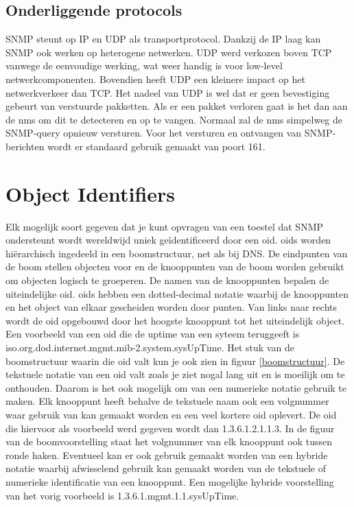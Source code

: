 \subsection{Onderliggende protocols}

SNMP steunt op IP en UDP als transportprotocol. Dankzij de IP laag kan SNMP ook werken op heterogene netwerken.
UDP werd verkozen boven TCP vanwege de eenvoudige werking, wat weer handig is voor low-level netwerkcomponenten.
Bovendien heeft UDP een kleinere impact op het netwerkverkeer dan TCP\cite{moreau}.
Het nadeel van UDP is wel dat er geen bevestiging gebeurt van verstuurde pakketten.
Als er een pakket verloren gaat is het dan aan de \gls{nms} om dit te detecteren en op te vangen.
Normaal zal de \gls{nms} simpelweg de SNMP-query opnieuw versturen.
Voor het versturen en ontvangen van SNMP-berichten wordt er standaard gebruik gemaakt van poort 161.


\section{Object Identifiers}
Elk mogelijk soort gegeven dat je kunt opvragen van een toestel dat SNMP ondersteunt wordt wereldwijd uniek geïdentificeerd\cite{moreau} door een \gls{oid}.
\glspl{oid} worden hiërarchisch ingedeeld in een boomstructuur, net als bij DNS. De eindpunten van de boom stellen objecten voor en de knooppunten van de boom
worden gebruikt om objecten logisch te groeperen. De namen van de knooppunten bepalen de uiteindelijke \gls{oid}.
\glspl{oid} hebben een dotted-decimal notatie waarbij de knooppunten en het object van elkaar gescheiden worden door punten. %
Van links naar rechts wordt de \gls{oid} opgebouwd door het hoogste knooppunt tot het uiteindelijk object.
Een voorbeeld van een \gls{oid} die de uptime van een syteem teruggeeft is iso.org.dod.internet.mgmt.mib-2.system.sysUpTime.
Het stuk van de boomstructuur waarin die \gls{oid} valt kun je ook zien in figuur \ref{boomstructuur}.
De tekstuele notatie van een \gls{oid} valt zoals je ziet nogal lang uit en is moeilijk om te onthouden.
Daarom is het ook mogelijk om van een numerieke notatie gebruik te maken.
Elk knooppunt heeft behalve de tekstuele naam ook een volgnummer waar gebruik van kan gemaakt worden en een veel kortere \gls{oid} oplevert.
De \gls{oid} die hiervoor als voorbeeld werd gegeven wordt dan 1.3.6.1.2.1.1.3.
In de figuur van de boomvoorstelling staat het volgnummer van elk knooppunt ook tussen ronde haken. Eventueel kan er ook gebruik gemaakt worden van een
hybride notatie waarbij afwisselend gebruik kan gemaakt worden van de tekstuele of numerieke identificatie van een knooppunt.
Een mogelijke hybride voorstelling van het vorig voorbeeld is 1.3.6.1.mgmt.1.1.sysUpTime.

